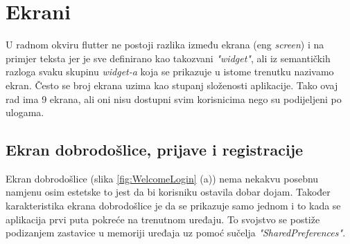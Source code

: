 \documentclass[times, utf8, zavrsni]{fer}
\begin{document}
\section{Ekrani}
U radnom okviru flutter ne postoji razlika između ekrana (eng \textit{screen}) i na primjer teksta jer je sve definirano
kao takozvani \textit{"widget"}, ali iz semantičkih razloga svaku skupinu \textit{widget-a} koja
se prikazuje u istome trenutku nazivamo ekran. Često se broj ekrana uzima kao stupanj
složenosti aplikacije. Tako ovaj rad ima 9 ekrana, ali oni nisu dostupni svim korisnicima nego
su podijeljeni po ulogama.

\subsection{Ekran dobrodošlice, prijave i registracije}
Ekran dobrodošlice (slika \ref{fig:WelcomeLogin} (a)) nema nekakvu posebnu namjenu osim estetske to jest da bi
korisniku ostavila dobar dojam. Također karakteristika ekrana dobrodošlice je
da se prikazuje samo jednom i to kada se aplikacija prvi puta pokreće na trenutnom
uređaju. To svojstvo se postiže podizanjem zastavice u memoriji uređaja uz pomoć
sučelja \textit{"SharedPreferences"}.
\end{document}
